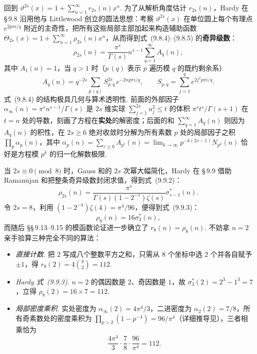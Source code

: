 回到 $\vartheta^{2s}(x)=1+\sum_{n=1}^{\infty}r_{2s}(n)x^n$. 为了从解析角度估计 $r_{2s}(n)$，Hardy 在 \S\,9.8 沿用他与 Littlewood 创立的圆法思想：考察 $\vartheta^{2s}(x)$ 在单位圆上每个有理点 $e^{2p\pi i/q}$ 附近的主奇性，把所有这些局部主部加起来构造辅助函数 $\Theta_{2s}(x)=1+\sum_{n=1}^{\infty}\rho_{2s}(n)x^n$，从而得到式~(9.8.4)--(9.8.5) 的\textbf{奇异级数}：
\begin{equation*}\tag{9.8.4}
\rho_{2s}(n)=\frac{\pi^s}{\Gamma(s)}n^{s-1}\sum_{q=1}^{\infty}A_q(n),
\end{equation*}
其中 $A_1(n)=1$，当 $q>1$ 时（$p\,(q)$ 表示 $p$ 遍历模 $q$ 的既约剩余系）
\begin{equation*}\tag{9.8.2,\,9.8.5}
A_q(n)=q^{-2s}\sum_{p\,(q)}S_{p,q}^{2s}\,e^{-2np\pi i/q},
\qquad
S_{p,q}=\sum_{j=1}^{q}e^{2j^2p\pi i/q}.
\end{equation*}
式~(9.8.4) 的结构极具几何与算术透明性. 前面的外部因子 $\alpha_\infty(n)=\pi^s n^{s-1}/\Gamma(s)$ 是 $2s$ 维实球 $\sum_{j=1}^{2s}u_j^2\le t$ 的体积 $\pi^s t^s/\Gamma(s+1)$ 在 $t=n$ 处的导数，刻画了方程在\textbf{实处}的解密度；后面的和 $\sum_{q=1}^{\infty}A_q(n)$ 则因为 $A_q(n)$ 的积性，在 $2s\ge 6$ 绝对收敛时分解为所有素数 $p$ 处的局部因子之积 $\prod_p\alpha_p(n)$，其中 $\alpha_p(n)=\sum_{r\ge 0}A_{p^r}(n)=\lim_{k\to\infty}p^{-k(2s-1)}N_{p^k}(n)$ 恰好是方程模 $p^k$ 的归一化解数极限.

当 $2s\equiv 0\pmod 8$ 时，Gauss 和的 $2s$ 次幂大幅简化，Hardy 在 \S\,9.9 借助 Ramanujan 和把整条奇异级数封闭求值，得到式~(9.9.2)：
\begin{equation*}\tag{9.9.2}
\rho_{2s}(n)=\frac{\pi^s}{\Gamma(s)(1-2^{-s})\zeta(s)}\sigma_{s-1}^*(n).
\end{equation*}
令 $2s=8$，利用 $(1-2^{-4})\zeta(4)=\pi^4/96$，便得到式~(9.9.3)：
\begin{equation*}\tag{9.9.3}
\rho_8(n)=16\sigma_3^*(n),
\end{equation*}
而随后 \S\S\,9.13--9.15 的模函数论证进一步确立了 $r_8(n)=\rho_8(n)$. 不妨拿 $n=2$ 亲手验算三种完全不同的算法：
\begin{itemize}
\item \emph{直接计数.} 把 $2$ 写成八个整数平方之和，只需从 $8$ 个坐标中选 $2$ 个并各自赋予 $\pm 1$，得 $r_8(2)=4\binom{8}{2}=112$.
\item \emph{Hardy 式~(9.9.3).} $n=2$ 的偶因数是 $2$、奇因数是 $1$，故 $\sigma_3^*(2)=2^3-1^3=7$，立得 $\rho_8(2)=16\times 7=112$.
\item \emph{局部密度乘积.} 实处密度为 $\alpha_\infty(2)=4\pi^4/3$，二进密度为 $\alpha_2(2)=7/8$，所有奇素数处的密度乘积为 $\prod_{p>2}(1-p^{-4})=96/\pi^4$（详细推导见），三者相乘恰为
\[
\frac{4\pi^4}{3}\cdot\frac{7}{8}\cdot\frac{96}{\pi^4}=112.
\]
\end{itemize}

